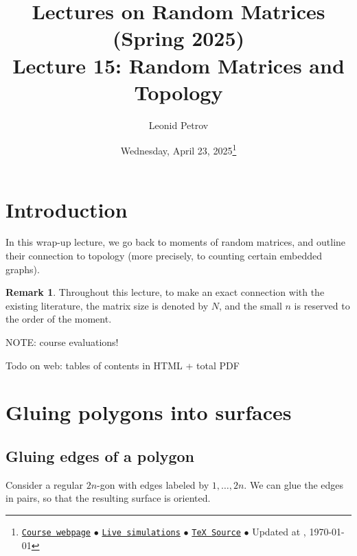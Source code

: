 \documentclass[letterpaper,11pt,oneside,reqno]{article}
\numberwithin{equation}{section}
\theoremstyle{definition}
\newtheorem{remark}[proposition]{Remark}
\begin{document}
\title{Lectures on Random Matrices
(Spring 2025)
\\Lecture 15: Random Matrices and Topology}


\date{Wednesday, April 23, 2025\footnote{\href{https://lpetrov.cc/rmt25/}{\texttt{Course webpage}}
$\bullet$ \href{https://lpetrov.cc/simulations/model/random-matrices/}{\texttt{Live simulations}}
$\bullet$ \href{https://lpetrov.cc/rmt25/rmt25-notes/rmt2025-l15.tex}{\texttt{TeX Source}}
$\bullet$
Updated at \currenttime, \today}}



\author{Leonid Petrov}


\maketitle
\tableofcontents


\section{Introduction}

In this wrap-up lecture, we go back to moments of random
matrices, and outline their connection to topology
(more precisely, to counting certain embedded graphs).

\begin{remark}
	Throughout this lecture, to make an exact connection with the existing literature,
	the matrix size is denoted by $N$, and the small $n$ is reserved to
	the order of the moment.
\end{remark}


\bigskip
{\huge{NOTE: course evaluations!}}

\bigskip

{\LARGE{Todo on web: tables of contents in HTML + total PDF}}

\section{Gluing polygons into surfaces}
\label{sec:gluing-polygons}
\subsection{Gluing edges of a polygon}

Consider a regular $2n$-gon with edges labeled by $1,\ldots,2n$.
We can glue the edges in pairs, so that the resulting
surface is oriented.
\end{document}
